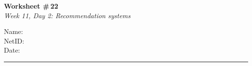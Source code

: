 \documentclass[11pt]{article}
\begin{document}
\noindent
\begin{minipage}[t]{0.55\textwidth}
  \vspace{0pt}
  {\LARGE \textbf{Worksheet \#\,22}} \\[0.3em]
  {\large \textit{Week 11, Day 2: Recommendation systems}}
\end{minipage}
\hfill
\begin{minipage}[t]{0.40\textwidth}
  \vspace{0pt}
  \begin{mdframed}[linecolor=black, linewidth=1pt, innertopmargin=10pt, innerbottommargin=10pt]
    \small
    \vspace{0.4cm}
    Name: \underline{\hspace{4.5cm}} \\[1em]
    NetID: \underline{\hspace{4.3cm}} \\[1em]
    Date: \underline{\hspace{4.4cm}} \\
  \end{mdframed}
\end{minipage}

\vspace{1em}
\noindent\rule{\linewidth}{1pt}
\vspace{0.2em}
\end{document}
